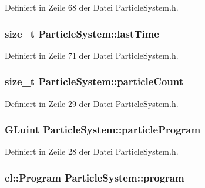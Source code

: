 Definiert in Zeile 68 der Datei Particle\-System.\-h.

\hypertarget{classParticleSystem_a7742c69f3c78fb025a3a8f0cb56aa272}{
\subsubsection[{last\-Time}]{\setlength{\rightskip}{0pt plus 5cm}size\-\_\-t Particle\-System\-::last\-Time\hspace{0.3cm}{\ttfamily [private]}}}\label{classParticleSystem_a7742c69f3c78fb025a3a8f0cb56aa272}


Definiert in Zeile 71 der Datei Particle\-System.\-h.

\hypertarget{classParticleSystem_a23f9a394b3c1eeb10f67a78daa2d47b6}{
\subsubsection[{particle\-Count}]{\setlength{\rightskip}{0pt plus 5cm}size\-\_\-t Particle\-System\-::particle\-Count}}\label{classParticleSystem_a23f9a394b3c1eeb10f67a78daa2d47b6}


Definiert in Zeile 29 der Datei Particle\-System.\-h.

\hypertarget{classParticleSystem_a817935d44dad68d336c6806bb764fa8a}{
\subsubsection[{particle\-Program}]{\setlength{\rightskip}{0pt plus 5cm}G\-Luint Particle\-System\-::particle\-Program}}\label{classParticleSystem_a817935d44dad68d336c6806bb764fa8a}


Definiert in Zeile 28 der Datei Particle\-System.\-h.

\hypertarget{classParticleSystem_ab2149ec3d27d4e7db0f94d70bcfe092b}{
\subsubsection[{program}]{\setlength{\rightskip}{0pt plus 5cm}cl\-::\-Program Particle\-System\-::program\hspace{0.3cm}{\ttfamily [private]}}}\label{classParticleSystem_ab2149ec3d27d4e7db0f94d70bcfe092b}


